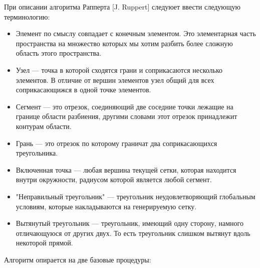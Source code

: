 \documentclass[14pt]{extreport}
\begin{document}
При описании алгоритма Рапперта [J. Ruppert] следуюет ввести следующую терминологию:
\begin{itemize}
\item Элемент по смыслу совпадает с конечным элементом. Это элементарная часть пространства на множество которых мы хотим разбить более сложную область этого пространства.

\item Узел — точка в которой сходятся грани и соприкасаются несколько элементов. В отличие от вершин элементов узел общий для всех соприкасающижся в одной точке элементов.

\item Сегмент — это отрезок, соединяющий две соседние точки лежащие на границе области разбиения, другими словами этот отрезок принадлежит контурам области.

\item Грань — это отрезок по которому граничат два соприкасающихся треугольника.

\item Включенная точка — любая вершина текущей сетки, которая находится внутри окружности, радиусом которой является любой сегмент.

\item "Неправильный треугольник" — треугольник неудовлетворяющий глобальным условиям, которые накладываются на генерируемую сетку.

\item Вытянутый треугольник — треугольник, имеющий одну сторону, намного отличающуюся от других двух. То есть треугольник слишком вытянут вдоль некоторой прямой. 
\end{itemize}

Алгоритм опирается на две базовые процедуры: 
\end{document}
